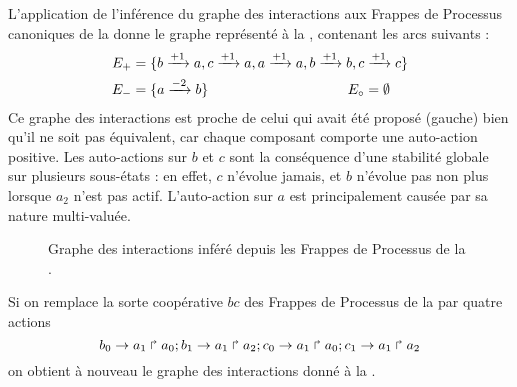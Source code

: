 \begin{example}
  L'application de l'inférence du graphe des interactions aux Frappes de Processus canoniques
  de la  donne le graphe représenté à la ,
  contenant les arcs suivants :
  \begin{align*}
    E_+ &= \{b \xrightarrow{+ 1} a, c \xrightarrow{+ 1} a, a \xrightarrow{+ 1} a,
      b \xrightarrow{+ 1} b, c \xrightarrow{+ 1} c\} \\
    E_- &= \{a \xrightarrow{- 2} b\} \qquad\qquad\qquad\qquad\qquad
    E_\circ = \emptyset
  \end{align*}
  Ce graphe des interactions est proche de celui qui avait été proposé
  (gauche) bien qu'il ne soit pas équivalent,
  car chaque composant comporte une auto-action positive.
  Les auto-actions sur $b$ et $c$ sont la conséquence d'une stabilité globale
  sur plusieurs sous-états : en effet, $c$ n'évolue jamais,
  et $b$ n'évolue pas non plus lorsque $a_2$ n'est pas actif.
  L'auto-action sur $a$ est principalement causée par sa nature multi-valuée.
  
  \begin{figure}[ht]
  \centering
  \caption{%
    Graphe des interactions inféré depuis les Frappes de Processus de la .
  }
  \end{figure}
\end{example}

\begin{example}
  Si on remplace la sorte coopérative $bc$ des Frappes de Processus de la 
  par quatre actions
  \[ b_0\rightarrow a_1\Rsh a_0 ; b_1\rightarrow a_1\Rsh a_2 ;
     c_0\rightarrow a_1\Rsh a_0 ; c_1\rightarrow a_1\Rsh a_2 \]
  on obtient à nouveau le graphe des interactions donné à la .
\end{example}

